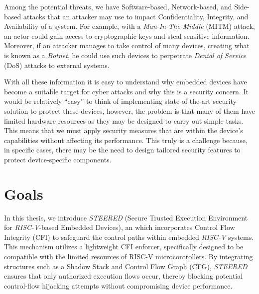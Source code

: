 Among the potential threats, we have Software-based, Network-based, and Side-based
attacks that an attacker may use to impact Confidentiality, Integrity, and
Availability of a system. For example, with a \textit{Man-In-The-Middle} (MITM) attack,
an actor could gain access to cryptographic keys and steal sensitive information.
Moreover, if an attacker manages to take control of many devices, creating what is
known as a \textit{Botnet}, he could use such devices to perpetrate \textit{Denial
of Service} (DoS) attacks to external systems.

With all these information it is easy to understand why embedded devices have
become a suitable target for cyber attacks and why this is a security concern. It
would be relatively ``easy'' to think of implementing state-of-the-art security solution
to protect these devices, however, the problem is that many of them have limited
hardware resources as they may be designed to carry out simple tasks. This means
that we must apply security measures that are within the device's capabilities
without affecting its performance. This truly is a challenge because, in
specific cases, there may be the need to design tailored security features to protect
device-specific components.

\section{Goals}
\label{sec:intro_goals}

In this thesis, we introduce \textit{STEERED} (Secure Trusted Execution Environment
for \textit{RISC-V}-based Embedded Devices), an which incorporates Control Flow
Integrity (CFI) to safeguard the control paths within embedded \textit{RISC-V} systems.
This mechanism utilizes a lightweight CFI enforcer, specifically designed to be compatible
with the limited resources of RISC-V microcontrollers. By integrating structures
such as a Shadow Stack and Control Flow Graph (CFG), \textit{STEERED} ensures
that only authorized execution flows occur, thereby blocking potential control-flow
hijacking attempts without compromising device performance.

